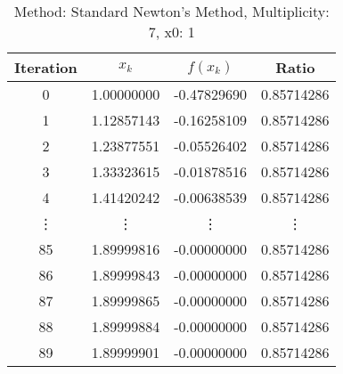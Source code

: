\begin{table}
\centering
\caption{Method: Standard Newton's Method, Multiplicity: 7, x0: 1}
\label{tab:table_Standard_Newton's_Method_7_1}
\begin{tabular}{c c c c}
\toprule
Iteration &      $x_k$ &    $f(x_k)$ &      Ratio \\
\midrule
        0 & 1.00000000 & -0.47829690 & 0.85714286 \\
        1 & 1.12857143 & -0.16258109 & 0.85714286 \\
        2 & 1.23877551 & -0.05526402 & 0.85714286 \\
        3 & 1.33323615 & -0.01878516 & 0.85714286 \\
        4 & 1.41420242 & -0.00638539 & 0.85714286 \\
   \vdots &     \vdots &      \vdots &     \vdots \\
       85 & 1.89999816 & -0.00000000 & 0.85714286 \\
       86 & 1.89999843 & -0.00000000 & 0.85714286 \\
       87 & 1.89999865 & -0.00000000 & 0.85714286 \\
       88 & 1.89999884 & -0.00000000 & 0.85714286 \\
       89 & 1.89999901 & -0.00000000 & 0.85714286 \\
\bottomrule
\end{tabular}
\end{table}
